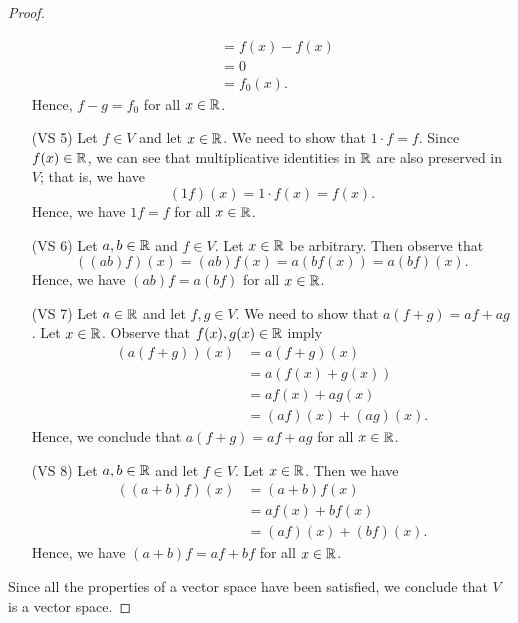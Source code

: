 \begin{proof}
\begin{enumerate}
\begin{align*}
                         &= f(x) - f(x) \\
                         &= 0 \\
                         &= f_{0}(x).
            \end{align*}
            Hence, \( f - g = f_{0}  \) for all \( x \in \mathbb{R}  \).
        \item[(VS 5)] Let \( f \in V  \) and let \( x \in \mathbb{R}  \). We need to show that \( 1 \cdot f = f  \). Since \( f(x) \in \mathbb{R}  \), we can see that multiplicative identities in \( \mathbb{R}  \) are also preserved in \( V  \); that is, we have
            \[  (1f)(x) = 1 \cdot f(x) = f(x).  \]
            Hence, we have \( 1 f = f  \) for all \( x \in \mathbb{R}  \).
        \item[(VS 6)] Let \( a, b \in \mathbb{R}   \) and \( f \in V  \). Let \( x \in \mathbb{R}  \) be arbitrary. Then observe that 
            \[  ((ab)f)(x) = (ab) f(x) = a (bf(x)) = a (bf)(x).  \]
            Hence, we have \( (ab)f = a(bf) \) for all \( x \in \mathbb{R}  \).
        \item[(VS 7)] Let \( a \in \mathbb{R}  \) and let \( f,g \in V  \). We need to show that \( a (f+ g) = af  +ag \). Let \( x \in \mathbb{R}  \). Observe that  \( f(x) , g(x) \in \mathbb{R}  \) imply
            \begin{align*}
                (a(f+g))(x) &= a(f+g)(x) \\
                            &= a (f(x) + g(x)) \\
                            &= af(x) + ag(x) \\
                            &= (af)(x) + (ag)(x).
            \end{align*}
            Hence, we conclude that \( a(f+g) = af + ag \) for all \(  x \in \mathbb{R}  \).
        \item[(VS 8)] Let \( a,b \in \mathbb{R}  \) and let \( f \in V  \). Let \( x \in \mathbb{R}  \). Then we have 
            \begin{align*}
                ((a+b)f)(x) &= (a+b)f(x)  \\
                            &= af(x) + bf(x) \\
                            &= (af)(x) + (bf)(x).
            \end{align*}
            Hence, we have \( (a+b)f = af + bf \) for all \( x \in \mathbb{R}  \).
    \end{enumerate}
    Since all the properties of a vector space have been satisfied, we conclude that \( V  \) is a vector space.
\end{proof}




